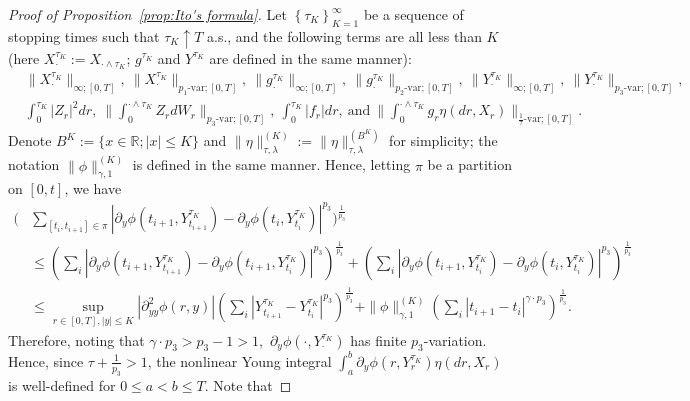 \documentclass[10pt,a4paper]{amsart}
\def\R{\mathbb R}
\begin{document}
\begin{proof}[Proof of Proposition~\ref{prop:Ito's formula}]
Let $\left\{\tau_{K}\right\}_{K=1}^{\infty}$   be a sequence of stopping times such that $\tau_{K} \uparrow T$ a.s., and the following terms are all less than $K$ (here $X^{\tau_{K}}_{\cdot} := X_{\cdot\land\tau_{K}}$; $g^{\tau_{K}}$ and $Y^{\tau_{K}}$ are defined in the same manner):
\begin{equation*}
\begin{aligned}
&\|X^{\tau_{K}}_{\cdot}\|_{\infty;[0,T]},\ \|X^{\tau_{K}}_{\cdot}\|_{p_{1}\text{-var};[0,T]},\ \|g^{\tau_{K}}_{\cdot}\|_{\infty;[0,T]},\ \|g^{\tau_{K}}_{\cdot}\|_{p_{2}\text{-var};[0,T]},\ \|Y^{\tau_{K}}_{\cdot}\|_{\infty;[0,T]},\ \|Y^{\tau_{K}}_{\cdot}\|_{p_{3}\text{-var};[0,T]},\\
&\int_{0}^{\tau_{K}}|Z_{r}|^{2}dr,\ \Big\|\int_{0}^{\cdot\land\tau_{K}}Z_{r}dW_{r}\Big\|_{p_{3}\text{-var};[0,T]},\ \int_{0}^{\tau_{K}}|f_{r}|dr,\ \text{and}\ \Big\|\int_{0}^{\cdot\land \tau_{K}}g_{r}\eta(dr,X_{r})\Big\|_{\frac{1}{\tau}\text{-var};[0,T]}.
\end{aligned}
\end{equation*}
Denote $B^{K}:=\{x\in\R;|x|\le K\}$ and  $\|\eta\|^{(K)}_{\tau,\lambda} := \|\eta\|^{(B^{K})}_{\tau,\lambda}$ for simplicity; the notation $\|\phi\|^{(K)}_{\gamma,1}$ is defined in the same manner. Hence, letting $\pi$ be a partition on $[0,t]$, we have 
\begin{equation*}
\begin{aligned}
\Bigg(&\sum_{[t_{i},t_{i+1}]\in\pi}\left|\partial_{y}\phi(t_{i+1},Y^{\tau_{K}}_{t_{i+1}}) - \partial_{y}\phi(t_{i},Y^{\tau_{K}}_{t_{i}})\right|^{p_{3}}\Bigg)^{\frac{1}{p_{3}}}\\
&\le \left(\sum_{i}\left|\partial_{y}\phi(t_{i+1},Y^{\tau_{K}}_{t_{i+1}}) - \partial_{y}\phi(t_{i+1},Y^{\tau_{K}}_{t_{i}})\right|^{p_{3}}\right)^{\frac{1}{p_{3}}} + \left(\sum_{i}\left|\partial_{y}\phi(t_{i+1},Y^{\tau_{K}}_{t_{i}}) - \partial_{y}\phi(t_{i},Y^{\tau_{K}}_{t_{i}})\right|^{p_{3}}\right)^{\frac{1}{p_{3}}}\\
&\le \sup_{r\in[0,T],|y|\le K} |\partial^{2}_{yy}\phi(r,y)|\left(\sum_{i}\left|Y^{\tau_{K}}_{t_{i+1}} - Y^{\tau_{K}}_{t_{i}}\right|^{p_{3}}\right)^{\frac{1}{p_{3}}} + \|\phi\|^{(K)}_{\gamma,1} \left(\sum_{i}\left|t_{i+1}-t_{i}\right|^{\gamma \cdot p_{3}}\right)^{\frac{1}{p_{3}}}.
\end{aligned}
\end{equation*}
Therefore, noting that $\gamma\cdot p_{3} > p_{3} - 1 > 1,$  $\partial_{y}\phi(\cdot,Y^{\tau_{K}}_{\cdot})$ has finite $p_{3}$-variation. Hence, since $\tau + \frac{1}{p_{3}}>1$, the nonlinear Young integral $\int_{a}^{b}\partial_{y}\phi(r,Y^{\tau_{K}}_{r})\eta(dr,X_{r})$ is well-defined for $0\le a <b \le T$. Note that

\end{proof}
\end{document}

